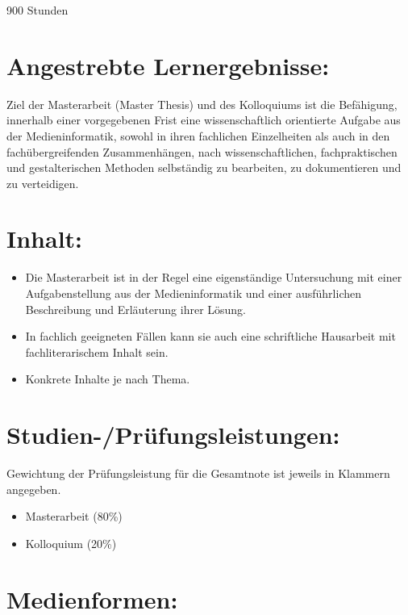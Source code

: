 900 Stunden

\section*{Angestrebte
Lernergebnisse:}\label{angestrebte-lernergebnisse-1}

Ziel der Masterarbeit (Master Thesis) und des Kolloquiums ist die
Befähigung, innerhalb einer vorgegebenen Frist eine wissenschaftlich
orientierte Aufgabe aus der Medieninformatik, sowohl in ihren fachlichen
Einzelheiten als auch in den fachübergreifenden Zusammenhängen, nach
wissenschaftlichen, fachpraktischen und gestalterischen Methoden
selbständig zu bearbeiten, zu dokumentieren und zu verteidigen.

\section*{Inhalt:}\label{inhalt-1}

\begin{itemize}
\tightlist
\item
  Die Masterarbeit ist in der Regel eine eigenständige Untersuchung mit
  einer Aufgabenstellung aus der Medieninformatik und einer
  ausführlichen Beschreibung und Erläuterung ihrer Lösung.
\item
  In fachlich geeigneten Fällen kann sie auch eine schriftliche
  Hausarbeit mit fachliterarischem Inhalt sein.
\item
  Konkrete Inhalte je nach Thema.
\end{itemize}

\section*{Studien-/Prüfungsleistungen:}\label{studien-pruxfcfungsleistungen-1}

Gewichtung der Prüfungsleistung für die Gesamtnote ist jeweils in
Klammern angegeben.

\begin{itemize}
\tightlist
\item
  Masterarbeit (80\%)
\item
  Kolloquium (20\%)
\end{itemize}

\section*{Medienformen:}\label{medienformen-1}

